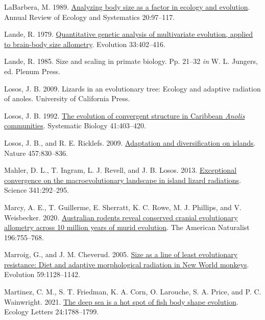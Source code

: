 \documentclass[
  11pt,
]{article}
\newlength{\cslhangindent}
\newlength{\cslentryspacingunit} %
\newenvironment{CSLReferences}[2] %
 {%
  \setlength{\parindent}{0pt}
  \ifodd #1
  \let\oldpar\par
  \def\par{\hangindent=\cslhangindent\oldpar}
  \fi
  \setlength{\parskip}{#2\cslentryspacingunit}
 }%
 {}
\begin{document}
\begin{CSLReferences}{1}{0}
\leavevmode{}%
LaBarbera, M. 1989.
\href{https://doi.org/10.1146/annurev.es.20.110189.000525}{Analyzing
body size as a factor in ecology and evolution}. Annual Review of
Ecology and Systematics 20:97--117.

\leavevmode{}%
Lande, R. 1979. \href{https://doi.org/10.2307/2407630}{Quantitative
genetic analysis of multivariate evolution, applied to brain-body size
allometry}. Evolution 33:402--416.

\leavevmode{}%
Lande, R. 1985. Size and scaling in primate biology. Pp. 21--32
\emph{in} W. L. Jungers, ed. Plenum Press.

\leavevmode{}%
Losos, J. B. 2009. Lizards in an evolutionary tree: Ecology and adaptive
radiation of anoles. University of California Press.

\leavevmode{}%
Losos, J. B. 1992. \href{https://doi.org/10.1093/sysbio/41.4.403}{The
evolution of convergent structure in {C}aribbean \emph{{A}nolis}
communities}. Systematic Biology 41:403--420.

\leavevmode{}%
Losos, J. B., and R. E. Ricklefs. 2009.
\href{https://doi.org/10.1038/nature07893}{Adaptation and
diversification on islands}. Nature 457:830--836.

\leavevmode{}%
Mahler, D. L., T. Ingram, L. J. Revell, and J. B. Losos. 2013.
\href{https://doi.org/10.1126/science.1232392}{Exceptional convergence
on the macroevolutionary landscape in island lizard radiations}. Science
341:292--295.

\leavevmode{}%
Marcy, A. E., T. Guillerme, E. Sherratt, K. C. Rowe, M. J. Phillips, and
V. Weisbecker. 2020. \href{https://doi.org/10.1086/711398}{Australian
rodents reveal conserved cranial evolutionary allometry across 10
million years of murid evolution}. The American Naturalist 196:755--768.

\leavevmode{}%
Marroig, G., and J. M. Cheverud. 2005.
\href{https://doi.org/10.1111/j.0014-3820.2005.tb01049.x}{Size as a line
of least evolutionary resistance: Diet and adaptive morphological
radiation in {N}ew {W}orld monkeys}. Evolution 59:1128--1142.

\leavevmode{}%
Martinez, C. M., S. T. Friedman, K. A. Corn, O. Larouche, S. A. Price,
and P. C. Wainwright. 2021. \href{https://doi.org/10.1111/ele.13785}{The
deep sea is a hot spot of fish body shape evolution}. Ecology Letters
24:1788--1799.


\end{CSLReferences}
\end{document}
